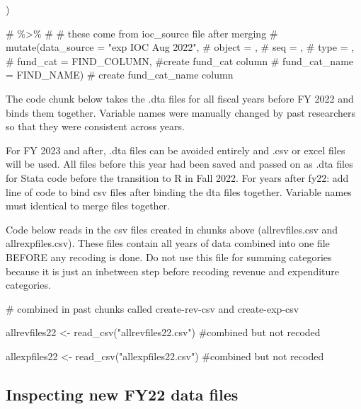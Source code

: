 \documentclass[
  letterpaper,
  DIV=11,
  numbers=noendperiod]{scrreport}
\newenvironment{Shaded}{\begin{snugshade}}{\end{snugshade}}
\newcommand{\CommentTok}[1]{\textcolor[rgb]{0.37,0.37,0.37}{#1}}
\newcommand{\FunctionTok}[1]{\textcolor[rgb]{0.28,0.35,0.67}{#1}}
\newcommand{\NormalTok}[1]{\textcolor[rgb]{0.00,0.23,0.31}{#1}}
\newcommand{\OtherTok}[1]{\textcolor[rgb]{0.00,0.23,0.31}{#1}}
\newcommand{\StringTok}[1]{\textcolor[rgb]{0.13,0.47,0.30}{#1}}
\begin{document}
\begin{Shaded}
\begin{Highlighting}[]
\NormalTok{  ) }

\CommentTok{\# \%\textgreater{}\%}
\CommentTok{\#   \# these come from ioc\_source file after merging}
\CommentTok{\#   mutate(data\_source = "exp IOC Aug 2022",}
\CommentTok{\#          object = ,}
\CommentTok{\#          seq = ,}
\CommentTok{\#          type = ,}
\CommentTok{\#          fund\_cat = FIND\_COLUMN, \#create fund\_cat column}
\CommentTok{\#          fund\_cat\_name = FIND\_NAME) \# create fund\_cat\_name column}
\end{Highlighting}
\end{Shaded}

The code chunk below takes the .dta files for all fiscal years before FY
2022 and binds them together. Variable names were manually changed by
past researchers so that they were consistent across years.

For FY 2023 and after, .dta files can be avoided entirely and .csv or
excel files will be used. All files before this year had been saved and
passed on as .dta files for Stata code before the transition to R in
Fall 2022. For years after fy22: add line of code to bind csv files
after binding the dta files together. Variable names must identical to
merge files together.

Code below reads in the csv files created in chunks above
(allrevfiles.csv and allrexpfiles.csv). These files contain all years of
data combined into one file BEFORE any recoding is done. Do not use this
file for summing categories because it is just an inbetween step before
recoding revenue and expenditure categories.

\begin{Shaded}
\begin{Highlighting}[]
\CommentTok{\# combined in past chunks called create{-}rev{-}csv and create{-}exp{-}csv}

\NormalTok{allrevfiles22 }\OtherTok{\textless{}{-}} \FunctionTok{read\_csv}\NormalTok{(}\StringTok{"allrevfiles22.csv"}\NormalTok{) }\CommentTok{\#combined but not recoded}

\NormalTok{allexpfiles22 }\OtherTok{\textless{}{-}} \FunctionTok{read\_csv}\NormalTok{(}\StringTok{"allexpfiles22.csv"}\NormalTok{) }\CommentTok{\#combined but not recoded}
\end{Highlighting}
\end{Shaded}

\hypertarget{inspecting-new-fy22-data-files}{%
\subsection{Inspecting new FY22 data
files}\label{inspecting-new-fy22-data-files}}
\end{document}
